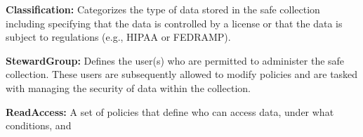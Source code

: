 \textbf{Classification:} Categorizes the type of data stored in the 
safe collection including specifying that the data is controlled by
a license or that the data is subject to regulations (e.g., HIPAA or FEDRAMP).

\textbf{StewardGroup:} Defines the user(s) who are permitted to 
administer the safe collection. These users are subsequently 
allowed to modify policies and are tasked with managing the 
security of data within the collection. 

\textbf{ReadAccess:} A set of policies that define who can
access data, under what conditions, and 


%
%

